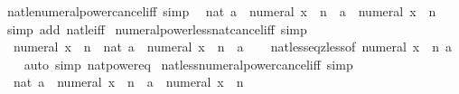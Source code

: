 \begin{isabellebody}
%
\isadelimproof
\isanewline
%
\endisadelimproof
\isanewline
{}\isamarkupfalse%
\ nat{\isacharunderscore}{\kern0pt}le{\isacharunderscore}{\kern0pt}numeral{\isacharunderscore}{\kern0pt}power{\isacharunderscore}{\kern0pt}cancel{\isacharunderscore}{\kern0pt}iff\ {\isacharbrackleft}{\kern0pt}simp{\isacharbrackright}{\kern0pt}{\isacharcolon}{\kern0pt}\isanewline
\ \ {\isachardoublequoteopen}nat\ a\ {\isasymle}\ numeral\ x\ {\isacharcircum}{\kern0pt}\ n\ {\isasymlongleftrightarrow}\ a\ {\isasymle}\ numeral\ x\ {\isacharcircum}{\kern0pt}\ n{\isachardoublequoteclose}\isanewline
%
\isadelimproof
\ \ %
\endisadelimproof
%
\isatagproof
{}\isamarkupfalse%
\ {\isacharparenleft}{\kern0pt}simp\ add{\isacharcolon}{\kern0pt}\ nat{\isacharunderscore}{\kern0pt}le{\isacharunderscore}{\kern0pt}iff{\isacharparenright}{\kern0pt}%
\endisatagproof
{\isafoldproof}%
%
\isadelimproof
\isanewline
%
\endisadelimproof
\isanewline
{}\isamarkupfalse%
\ numeral{\isacharunderscore}{\kern0pt}power{\isacharunderscore}{\kern0pt}less{\isacharunderscore}{\kern0pt}nat{\isacharunderscore}{\kern0pt}cancel{\isacharunderscore}{\kern0pt}iff\ {\isacharbrackleft}{\kern0pt}simp{\isacharbrackright}{\kern0pt}{\isacharcolon}{\kern0pt}\isanewline
\ \ {\isachardoublequoteopen}numeral\ x\ {\isacharcircum}{\kern0pt}\ n\ {\isacharless}{\kern0pt}\ nat\ a\ {\isasymlongleftrightarrow}\ numeral\ x\ {\isacharcircum}{\kern0pt}\ n\ {\isacharless}{\kern0pt}\ a{\isachardoublequoteclose}\isanewline
%
\isadelimproof
\ \ %
\endisadelimproof
%
\isatagproof
{}\isamarkupfalse%
\ nat{\isacharunderscore}{\kern0pt}less{\isacharunderscore}{\kern0pt}eq{\isacharunderscore}{\kern0pt}zless{\isacharbrackleft}{\kern0pt}of\ {\isachardoublequoteopen}numeral\ x\ {\isacharcircum}{\kern0pt}\ n{\isachardoublequoteclose}\ a{\isacharbrackright}{\kern0pt}\isanewline
\ \ \isamarkupfalse%
\ {\isacharparenleft}{\kern0pt}auto\ simp{\isacharcolon}{\kern0pt}\ nat{\isacharunderscore}{\kern0pt}power{\isacharunderscore}{\kern0pt}eq{\isacharparenright}{\kern0pt}%
\endisatagproof
{\isafoldproof}%
%
\isadelimproof
\isanewline
%
\endisadelimproof
\isanewline
{}\isamarkupfalse%
\ nat{\isacharunderscore}{\kern0pt}less{\isacharunderscore}{\kern0pt}numeral{\isacharunderscore}{\kern0pt}power{\isacharunderscore}{\kern0pt}cancel{\isacharunderscore}{\kern0pt}iff\ {\isacharbrackleft}{\kern0pt}simp{\isacharbrackright}{\kern0pt}{\isacharcolon}{\kern0pt}\isanewline
\ \ {\isachardoublequoteopen}nat\ a\ {\isacharless}{\kern0pt}\ numeral\ x\ {\isacharcircum}{\kern0pt}\ n\ {\isasymlongleftrightarrow}\ a\ {\isacharless}{\kern0pt}\ numeral\ x\ {\isacharcircum}{\kern0pt}\ n{\isachardoublequoteclose}\isanewline

\end{isabellebody}
